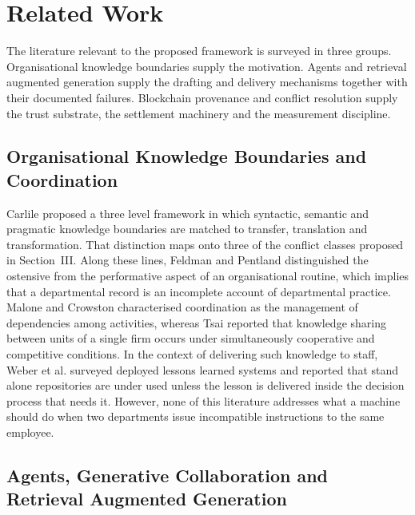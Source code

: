 \documentclass[journal]{IEEEtran}
\begin{document}
\section{Related Work}

The literature relevant to the proposed framework is surveyed in three groups. Organisational knowledge boundaries supply the motivation. Agents and retrieval augmented generation supply the drafting and delivery mechanisms together with their documented failures. Blockchain provenance and conflict resolution supply the trust substrate, the settlement machinery and the measurement discipline.

\subsection{Organisational Knowledge Boundaries and Coordination}

Carlile \cite{carlile2004transforming} proposed a three level framework in which syntactic, semantic and pragmatic knowledge boundaries are matched to transfer, translation and transformation. That distinction maps onto three of the conflict classes proposed in Section~III. Along these lines, Feldman and Pentland \cite{feldman2003routines} distinguished the ostensive from the performative aspect of an organisational routine, which implies that a departmental record is an incomplete account of departmental practice. Malone and Crowston \cite{malone1994coordination} characterised coordination as the management of dependencies among activities, whereas Tsai \cite{tsai2002coopetition} reported that knowledge sharing between units of a single firm occurs under simultaneously cooperative and competitive conditions. In the context of delivering such knowledge to staff, Weber et al. \cite{weber2001lessons} surveyed deployed lessons learned systems and reported that stand alone repositories are under used unless the lesson is delivered inside the decision process that needs it. However, none of this literature addresses what a machine should do when two departments issue incompatible instructions to the same employee.

\subsection{Agents, Generative Collaboration and Retrieval Augmented Generation}
\end{document}
